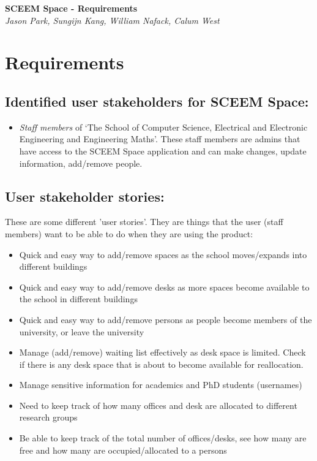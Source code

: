 \documentclass[11pt,a4paper]{article}
\begin{document}
\begin{titlepage}
   \begin{center}
      \Large\textbf{SCEEM Space - Requirements}\\
      \large\textit{Jason Park, Sungijn Kang, William Nafack, Calum West}
   \end{center}
\end{titlepage}

\section{Requirements}
\subsection{Identified user stakeholders for SCEEM Space:}
\begin{itemize}
    \item \textit{Staff members} of ‘The School of Computer Science, Electrical and Electronic Engineering and Engineering Maths’. These staff members are admins that have access to the SCEEM Space application and can make changes, update information, add/remove people.
\end{itemize}

\subsection{User stakeholder stories:}
These are some different 'user stories'. They are things that the user (staff members) want to be able to do when they are using the product:
\begin{itemize}
        \item Quick and easy way to add/remove spaces as the school moves/expands  into different buildings
        \item Quick and easy way to add/remove desks as more spaces become available to the school in different buildings
        \item Quick and easy way to add/remove persons as people become members of the university, or leave the university
        \item Manage (add/remove) waiting list effectively as desk space is limited. Check if there is any desk space that is about to become available for reallocation.
        \item Manage sensitive information for academics and PhD students (usernames)
        \item Need to keep track of how many offices and desk are allocated to different research groups
        \item Be able to keep track of the total number of offices/desks, see how many are free and how many are occupied/allocated to a persons
    \end{itemize}
\end{document}
